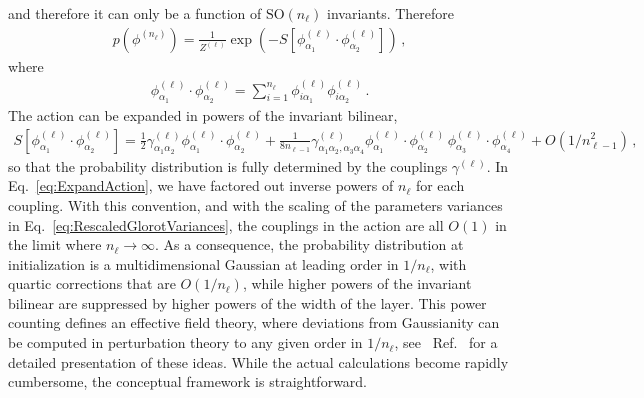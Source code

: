 \documentclass[11pt]{article}
\begin{document}
and therefore it can only be a function of $\text{SO}(n_{\ell})$ invariants. Therefore
\begin{align}
    \label{eq:PriorAction}
    p\left(\phi^{(n_\ell)}\right) =
        \frac{1}{Z^{(\ell)}} \exp\left(-S\left[\phi^{(\ell)}_{\alpha_1}
            \cdot \phi^{(\ell)}_{\alpha_2}\right]\right)\, ,
\end{align}
where
\begin{align}
    \label{eq:PhiInvariant}
    \phi^{(\ell)}_{\alpha_1}
            \cdot \phi^{(\ell)}_{\alpha_2} =
    \sum_{i=1}^{n_\ell} \phi^{(\ell)}_{i \alpha_1} \phi^{(\ell)}_{i \alpha_2}\, .
\end{align}
The action can be expanded in powers of the invariant bilinear,
\begin{align}
    \label{eq:ExpandAction}
    S\left[\phi^{(\ell)}_{\alpha_1}
            \cdot \phi^{(\ell)}_{\alpha_2}\right] =
        \frac12 \gamma^{(\ell)}_{\alpha_1\alpha_2}
            \phi^{(\ell)}_{\alpha_1} \cdot \phi^{(\ell)}_{\alpha_2} +
            \frac{1}{8 n_{\ell-1}} \gamma^{(\ell)}_{\alpha_1\alpha_2,\alpha_3\alpha_4}
            \phi^{(\ell)}_{\alpha_1} \cdot \phi^{(\ell)}_{\alpha_2} \,
            \phi^{(\ell)}_{\alpha_3} \cdot \phi^{(\ell)}_{\alpha_4} + O(1/n_{\ell-1}^2)\, ,
\end{align}
so that the probability distribution is fully determined by the couplings $\gamma^{(\ell)}$. In
Eq.~\eqref{eq:ExpandAction}, we have factored out inverse powers of $n_\ell$ for each coupling.
With this convention, and with the scaling of the parameters variances in
Eq.~\eqref{eq:RescaledGlorotVariances}, the couplings in the action are all $O(1)$
in the limit where $n_\ell\to\infty$.
As a consequence, the probability distribution at initialization is a multidimensional Gaussian at
leading order in $1/n_\ell$, with quartic corrections that are $O(1/n_\ell)$, while higher powers
of the invariant bilinear are suppressed by higher powers of the width of the layer. This power counting
defines an effective field theory, where deviations from Gaussianity can be computed in perturbation
theory to any given order in $1/n_\ell$, see \eg\ Ref.~\cite{Roberts:2021fes} for a detailed
presentation of these ideas. While the actual calculations become rapidly cumbersome, the
conceptual framework is straightforward.
\end{document}
